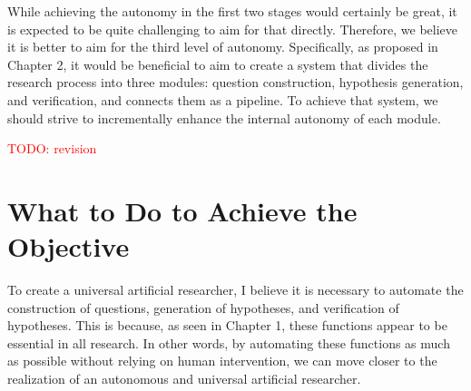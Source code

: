 \documentclass{book}
\begin{document}
While achieving the autonomy in the first two stages would certainly be great, it is expected to be quite challenging to aim for that directly. Therefore, we believe it is better to aim for the third level of autonomy. Specifically, as proposed in Chapter 2, it would be beneficial to aim to create a system that divides the research process into three modules: question construction, hypothesis generation, and verification, and connects them as a pipeline. To achieve that system, we should strive to incrementally enhance the internal autonomy of each module.

\textcolor{red}{TODO: revision}

\section{What to Do to Achieve the Objective}

To create a universal artificial researcher, I believe it is necessary to automate the construction of questions, generation of hypotheses, and verification of hypotheses. This is because, as seen in Chapter 1, these functions appear to be essential in all research. In other words, by automating these functions as much as possible without relying on human intervention, we can move closer to the realization of an autonomous and universal artificial researcher.



\end{document}
